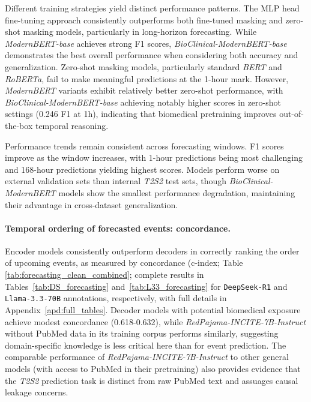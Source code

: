 \documentclass[letterpaper]{article} %
\begin{document}
Different training strategies yield distinct performance patterns. The MLP head fine-tuning approach consistently outperforms both fine-tuned masking and zero-shot masking models, particularly in long-horizon forecasting. While \textit{ModernBERT-base} achieves strong F1 scores, \textit{BioClinical-ModernBERT-base} demonstrates the best overall performance when considering both accuracy and generalization. Zero-shot masking models, particularly standard \textit{BERT} and \textit{RoBERTa}, fail to make meaningful predictions at the 1-hour mark. However, \textit{ModernBERT} variants exhibit relatively better zero-shot performance, with \textit{BioClinical-ModernBERT-base} achieving notably higher scores in zero-shot settings (0.246 F1 at 1h), indicating that biomedical pretraining improves out-of-the-box temporal reasoning.

Performance trends remain consistent across forecasting windows. F1 scores improve as the window increases, with 1-hour predictions being most challenging and 168-hour predictions yielding highest scores. Models perform worse on external validation sets than internal \textit{T2S2} test sets, though \textit{BioClinical-ModernBERT} models show the smallest performance degradation, maintaining their advantage in cross-dataset generalization.

\paragraph{Temporal ordering of forecasted events: concordance.}

Encoder models consistently outperform decoders in correctly ranking the order of upcoming events, as measured by concordance (c-index; Table \ref{tab:forecasting_clean_combined}; complete results in Tables~\ref{tab:DS_forecasting} and~\ref{tab:L33_forecasting} for \texttt{DeepSeek-R1} and \texttt{Llama-3.3-70B} annotations, respectively, with full details in Appendix~\ref{apd:full_tables}. Decoder models with potential biomedical exposure achieve modest concordance (0.618-0.632), while \textit{RedPajama-INCITE-7B-Instruct} without PubMed data in its training corpus performs similarly, suggesting domain-specific knowledge is less critical here than for event prediction. The comparable performance of \textit{RedPajama-INCITE-7B-Instruct} to other general models (with access to PubMed in their pretraining) also provides evidence that the \textit{T2S2} prediction task is distinct from raw PubMed text and assuages causal leakage concerns.
\end{document}

